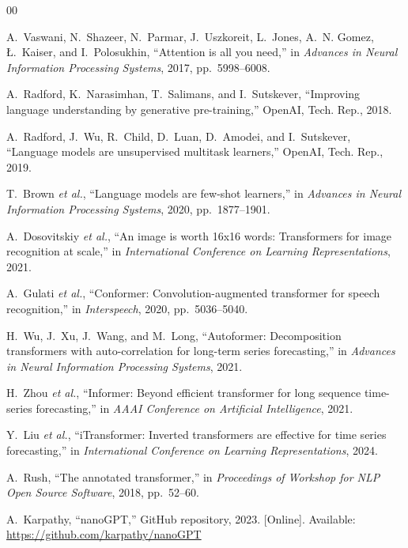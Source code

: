 \documentclass[conference]{IEEEtran}
\begin{document}
\begin{thebibliography}{00}

A.~Vaswani, N.~Shazeer, N.~Parmar, J.~Uszkoreit, L.~Jones, A.~N. Gomez, {\L}.~Kaiser, and I.~Polosukhin, ``Attention is all you need,'' in \textit{Advances in Neural Information Processing Systems}, 2017, pp.~5998--6008.

A.~Radford, K.~Narasimhan, T.~Salimans, and I.~Sutskever, ``Improving language understanding by generative pre-training,'' OpenAI, Tech. Rep., 2018.

A.~Radford, J.~Wu, R.~Child, D.~Luan, D.~Amodei, and I.~Sutskever, ``Language models are unsupervised multitask learners,'' OpenAI, Tech. Rep., 2019.

T.~Brown \textit{et al.}, ``Language models are few-shot learners,'' in \textit{Advances in Neural Information Processing Systems}, 2020, pp.~1877--1901.

A.~Dosovitskiy \textit{et al.}, ``An image is worth 16x16 words: Transformers for image recognition at scale,'' in \textit{International Conference on Learning Representations}, 2021.

A.~Gulati \textit{et al.}, ``Conformer: Convolution-augmented transformer for speech recognition,'' in \textit{Interspeech}, 2020, pp.~5036--5040.

H.~Wu, J.~Xu, J.~Wang, and M.~Long, ``Autoformer: Decomposition transformers with auto-correlation for long-term series forecasting,'' in \textit{Advances in Neural Information Processing Systems}, 2021.

H.~Zhou \textit{et al.}, ``Informer: Beyond efficient transformer for long sequence time-series forecasting,'' in \textit{AAAI Conference on Artificial Intelligence}, 2021.

Y.~Liu \textit{et al.}, ``iTransformer: Inverted transformers are effective for time series forecasting,'' in \textit{International Conference on Learning Representations}, 2024.

A.~Rush, ``The annotated transformer,'' in \textit{Proceedings of Workshop for NLP Open Source Software}, 2018, pp.~52--60.

A.~Karpathy, ``nanoGPT,'' GitHub repository, 2023. [Online]. Available: \url{https://github.com/karpathy/nanoGPT}


\end{thebibliography}
\end{document}

